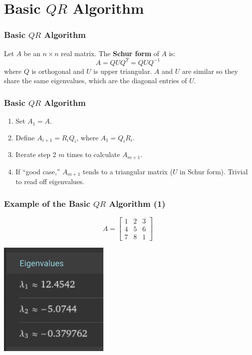 \documentclass{beamer}
\begin{document}
\section{Basic $QR$ Algorithm}
\frame{\sectionpage}

\begin{frame}
	\frametitle{Basic $QR$ Algorithm}
	\begin{tcolorbox}[title={Schur form},colback=blue!5!white,colframe=blue!75!black,parbox=false]
		Let $A$ be an $n\times n$ real matrix. The \textbf{Schur form} of $A$ is:
		\begin{equation*}
			A=QUQ^T=QUQ^{-1}
		\end{equation*}
		where $Q$ is orthogonal and $U$ is upper triangular. $A$ and $U$ are similar so they share the same eigenvalues, which are the diagonal entries of $U$.
	\end{tcolorbox}
\end{frame}

\begin{frame}
	\frametitle{Basic $QR$ Algorithm}
	\begin{tcolorbox}[title={Basic $QR$ Algorithm},colback=red!5!white,colframe=red!75!black,parbox=false]
		\begin{enumerate}
			\item<2-> Set $A_1=A$.
			\item<3-> Define $A_{i+1}=R_iQ_i$, where $A_1=Q_iR_i$.
			\item<4-> Iterate step 2 $m$ times to calculate $A_{m+1}$.
			\item<5-> If ``good case,'' $A_{m+1}$ tends to a triangular matrix ($U$ in Schur form). Trivial to read off eigenvalues.
		\end{enumerate}
	\end{tcolorbox}
\end{frame}

\begin{frame}
	\frametitle{Example of the Basic $QR$ Algorithm (1)}
	\begin{equation*}
	    A=\begin{bmatrix}
			1 & 2 & 3 \\
			4 & 5 & 6 \\
			7 & 8 & 1
	    \end{bmatrix}
	\end{equation*}
	\begin{center}
		\includegraphics[width=0.4\textwidth]{eigenvalues.png}
	\end{center}
\end{frame}
\end{document}
